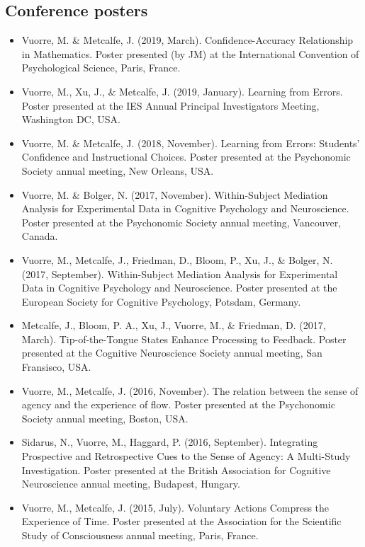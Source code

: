 \documentclass[12pt, a4paper]{article}
\newcommand{\years}[1]{\marginnote{\scriptsize #1}}
\begin{document}
\subsection*{Conference posters}
\begin{itemize}
\item \years{2019} Vuorre, M. \& Metcalfe, J. (2019, March). Confidence-Accuracy Relationship in Mathematics. Poster presented (by JM) at the International Convention of Psychological Science, Paris, France.
\item Vuorre, M., Xu, J., \& Metcalfe, J. (2019, January). Learning from Errors. Poster presented at the IES Annual Principal Investigators Meeting, Washington DC, USA.
\item \years{2018} Vuorre, M. \& Metcalfe, J. (2018, November). Learning from Errors: Students' Confidence and Instructional Choices. Poster presented at the Psychonomic Society annual meeting, New Orleans, USA.
\item \years{2017} Vuorre, M. \& Bolger, N. (2017, November). Within-Subject Mediation Analysis for Experimental Data in Cognitive Psychology and Neuroscience. Poster presented at the Psychonomic Society annual meeting, Vancouver, Canada.
\item Vuorre, M., Metcalfe, J., Friedman, D., Bloom, P., Xu, J., \& Bolger, N. (2017, September). Within-Subject Mediation Analysis for Experimental Data in Cognitive Psychology and Neuroscience. Poster presented at the European Society for Cognitive Psychology, Potsdam, Germany.
\item Metcalfe, J., Bloom, P. A., Xu, J., Vuorre, M., \& Friedman, D. (2017, March). Tip-of-the-Tongue States Enhance Processing to Feedback. Poster presented at the Cognitive Neuroscience Society annual meeting, San Fransisco, USA.
\item \years{2016} Vuorre, M., Metcalfe, J. (2016, November). The relation between the sense of agency and the experience of flow. Poster presented at the Psychonomic Society annual meeting, Boston, USA.
\item Sidarus, N., Vuorre, M., Haggard, P. (2016, September). Integrating Prospective and Retrospective Cues to the Sense of Agency: A Multi-Study Investigation. Poster presented at the British Association for Cognitive Neuroscience annual meeting, Budapest, Hungary.
\item \years{2015} Vuorre, M., Metcalfe, J. (2015, July). Voluntary Actions Compress the Experience of Time. Poster presented at the Association for the Scientific Study of Consciousness annual meeting, Paris, France.

\end{itemize}
\end{document}
